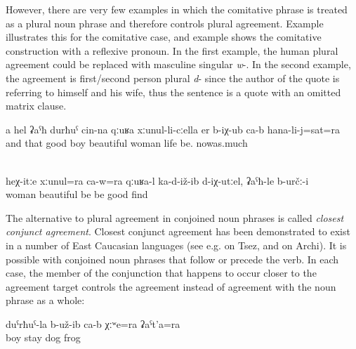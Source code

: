However, there are very few examples in which the comitative phrase is treated as a plural noun phrase and therefore controls plural agreement. Example  illustrates this for the comitative case, and example  shows the comitative construction with a reflexive pronoun. In the first example, the human plural agreement could be replaced with masculine singular \textit{w}-. In the second example, the agreement is first/second person plural \textit{d}- since the author of the quote is referring to himself and his wife, thus the sentence is a quote with an omitted matrix clause.
%
\begin{exe}
	\ex	\label{ex:‎The good boy with this beautiful wife lived until now}
	\gll	a	hel	ʡaˁħ	durħuˁ	cin-na	qːuʁa	xːunul-li-cːella er b-iχ-ub ca-b hana-li-j=sat=ra\\
		and	that	good	boy		beautiful	woman	life	be.		nowas.much\\
	\glt	{}

	\\	\label{ex:If he would sit together with his wife well like this, this would be good}
	\gll	heχ-itːe xːunul=ra	ca-w=ra	qːuʁa-l	ka-d-iž-ib	d-iχ-utːel,	ʡaˁħ-le	b-určː-i\\
			woman		beautiful	be	be	good	find\\
	\glt	{}
\end{exe}

The alternative to plural agreement in conjoined noun phrases is called \textit{closest conjunct agreement}. Closest conjunct agreement has been demonstrated to exist in a number of East Caucasian languages (see e.g. \citealp{Polinsky.etal2009} on Tsez, and \citealp{Chumakina2014} on Archi). It is possible with conjoined noun phrases that follow or precede the verb. In each case, the member of the conjunction that happens to occur closer to the agreement target controls the agreement instead of agreement with the noun phrase as a whole:
%
\begin{exe}
	\ex	\label{ex:‎The boy had a dog and a frog}
	\gll	duˁrħuˁ-la	b-už-ib	ca-b	χːʷe=ra	ʡaˁt'a=ra\\
		boy	stay		dog\tsc{=add}	frog\\
	\glt	{}
\end{exe}

